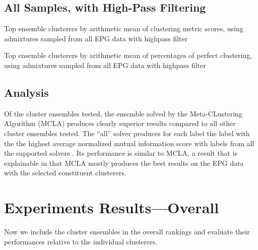 \subsection{All Samples, with High-Pass Filtering}

\begin{table}[H]
\centering
{}
\caption{Top ensemble clusterers by arithmetic mean of clustering metric scores, using admixtures sampled from all EPG data with highpass filter}
\label{table:top_ensemble_clusterers_by_metrics_highpass_71-sampleids_all-nruns_1000}
\end{table}

\begin{table}[H]
\centering
{}
\caption{Top ensemble clusterers by arithmetic mean of percentages of perfect clustering, using admixtures sampled from all EPG data with highpass filter}
\label{table:top_ensemble_clusterers_by_binomial_confidence_highpass_71-sampleids_all-nruns_1000}
\end{table}

\subsection{Analysis}

Of the cluster ensembles tested, the ensemble solved by the Meta-CLustering Algorithm (MCLA) produces clearly superior results compared to all other cluster ensembles tested. The ``all'' solver produces for each label the label with the the highest average normalized mutual information score with labels from all the supported solvers \cite{sano_clusterensembles_nodate}. Its performance is similar to MCLA, a result that is explainable in that MCLA mostly produces the best results on the EPG data with the selected constituent clusterers.

\section{Experiments Results---Overall}

Now we include the cluster ensembles in the overall rankings and evaluate their performances relative to the individual clusterers.

